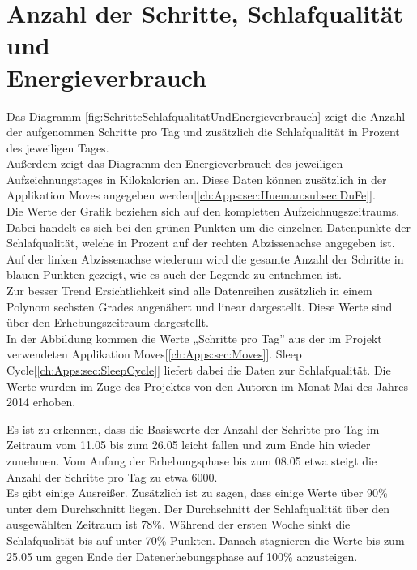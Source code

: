 \section{Anzahl der Schritte, Schlafqualität und\\ Energieverbrauch}
\label{ch:AnalyseUndEvaluierung:sec:SchritteSchlafqualitätUndEnergieverbrauch}


Das Diagramm \ref{fig:SchritteSchlafqualitätUndEnergieverbrauch} zeigt die Anzahl der aufgenommen Schritte pro Tag und zusätzlich die Schlafqualität in Prozent des jeweiligen Tages. \\
Außerdem zeigt das Diagramm den Energieverbrauch des jeweiligen Aufzeichnungstages in Kilokalorien an.
Diese Daten können zusätzlich in der Applikation Moves angegeben werden[\ref{ch:Apps:sec:Hueman:subsec:DuFe}]. \\ 
Die Werte der Grafik beziehen sich auf den kompletten Aufzeichnugszeitraums. 
Dabei handelt es sich bei den grünen Punkten um die einzelnen Datenpunkte der Schlafqualität, welche in Prozent auf der rechten Abzissenachse angegeben ist.
Auf der linken Abzissenachse wiederum wird die gesamte Anzahl der Schritte in blauen Punkten gezeigt, wie es auch der Legende zu entnehmen ist. \\
Zur besser Trend Ersichtlichkeit sind alle Datenreihen zusätzlich in einem Polynom sechsten Grades angenähert und linear dargestellt.
Diese Werte sind über den Erhebungszeitraum dargestellt. \\
In der Abbildung kommen die Werte „Schritte pro Tag” aus der im Projekt verwendeten Applikation Moves[\ref{ch:Apps:sec:Moves}]. 
Sleep Cycle[\ref{ch:Apps:sec:SleepCycle}] liefert dabei die Daten zur Schlafqualität.
Die Werte wurden im Zuge des Projektes von den Autoren im Monat Mai des Jahres 2014 erhoben.

Es ist zu erkennen, dass die Basiswerte der Anzahl der Schritte pro Tag im Zeitraum vom 11.05 bis zum 26.05 leicht fallen und zum Ende hin wieder zunehmen. 
Vom Anfang der Erhebungsphase bis zum 08.05 etwa steigt die Anzahl der Schritte pro Tag zu etwa 6000. \\
Es gibt einige Ausreißer.
Zusätzlich ist zu sagen, dass einige Werte über 90\% unter dem Durchschnitt liegen.
Der Durchschnitt der Schlafqualität über den ausgewählten Zeitraum ist 78\%.
Während der ersten Woche sinkt die Schlafqualität bis auf unter 70\% Punkten.
Danach stagnieren die Werte bis zum 25.05 um gegen Ende der Datenerhebungsphase auf 100\% anzusteigen.

